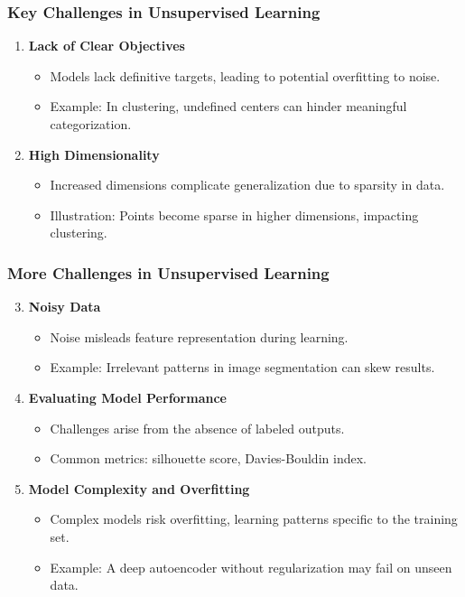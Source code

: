 \documentclass[aspectratio=169]{beamer}
\begin{document}
\begin{frame}[fragile]
    \frametitle{Key Challenges in Unsupervised Learning}
    
    \begin{enumerate}
        \item \textbf{Lack of Clear Objectives}
        \begin{itemize}
            \item Models lack definitive targets, leading to potential overfitting to noise.
            \item Example: In clustering, undefined centers can hinder meaningful categorization.
        \end{itemize}
        
        \item \textbf{High Dimensionality}
        \begin{itemize}
            \item Increased dimensions complicate generalization due to sparsity in data.
            \item Illustration: Points become sparse in higher dimensions, impacting clustering.
        \end{itemize}
    \end{enumerate}
\end{frame}

\begin{frame}[fragile]
    \frametitle{More Challenges in Unsupervised Learning}
    
    \begin{enumerate}
        \setcounter{enumi}{2}
        \item \textbf{Noisy Data}
        \begin{itemize}
            \item Noise misleads feature representation during learning.
            \item Example: Irrelevant patterns in image segmentation can skew results.
        \end{itemize}
        
        \item \textbf{Evaluating Model Performance}
        \begin{itemize}
            \item Challenges arise from the absence of labeled outputs.
            \item Common metrics: silhouette score, Davies-Bouldin index.
        \end{itemize}
        
        \item \textbf{Model Complexity and Overfitting}
        \begin{itemize}
            \item Complex models risk overfitting, learning patterns specific to the training set.
            \item Example: A deep autoencoder without regularization may fail on unseen data.
        \end{itemize}
    \end{enumerate}
\end{frame}
\end{document}
